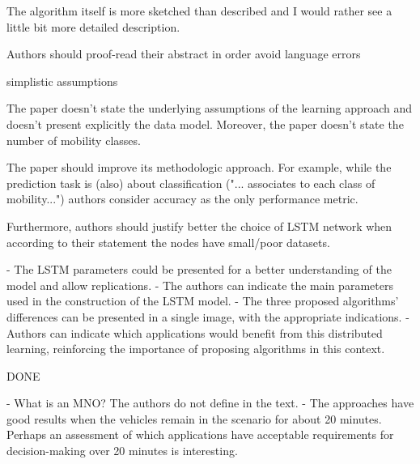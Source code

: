 The algorithm itself is more sketched than described and I would rather see a little bit more detailed description.

Authors should proof-read their abstract in order avoid language errors 

simplistic assumptions

The paper doesn't state the underlying assumptions of the learning approach and doesn't present explicitly the data model. Moreover, the paper doesn't state the number of mobility classes.

The paper should improve its methodologic approach. For example, while the prediction task is (also) about classification ("... associates to each class of mobility...") authors consider accuracy as the only performance metric. 

Furthermore, authors should justify better the choice of LSTM network when according to their statement the nodes have small/poor datasets.


- The LSTM parameters could be presented for a better understanding of the model and allow replications.
- The authors can indicate the main parameters used in the construction of the LSTM model.
- The three proposed algorithms' differences can be presented in a single image, with the appropriate indications.
- Authors can indicate which applications would benefit from this distributed learning, reinforcing the importance of proposing algorithms in this context.

DONE

- What is an MNO? The authors do not define in the text.
- The approaches have good results when the vehicles remain in the scenario for about 20 minutes. Perhaps an assessment of which applications have acceptable requirements for decision-making over 20 minutes is interesting.